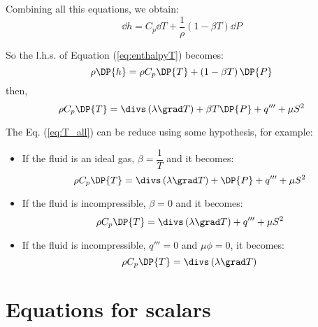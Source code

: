 Combining all this equations, we obtain:
\begin{equation}
  \dd h=C_p \dd T + \frac{1}{\rho} \left( 1-\beta T \right)\dd P
\end{equation}

So the l.h.s. of Equation (\ref{eq:enthalpyT}) becomes:
\begin{equation}
 \rho \DP{h} = \rho C_p \DP{T} + \left( 1-\beta T \right)\DP{P}
\end{equation}
%
 then,
\begin{equation}
  \rho C_p \DP{T}=  \divs \left( \lambda \grad T \right) + \beta T \DP{P} +q''' + \mu S^2
\label{eq:T_all}
\end{equation}

The Eq. (\ref{eq:T_all}) can be reduce using some hypothesis, for example:
\begin{itemize}
 \item If the fluid is an ideal gas, $\beta=\dfrac{1}{T}$ and it becomes:
\begin{equation}
  \rho C_p \DP{T}=  \divs \left( \lambda \grad T \right) + \DP{P} +q''' + \mu S^2
\end{equation}

 \item If the fluid is incompressible, $\beta=0$ and it becomes:
\begin{equation}
  \rho C_p \DP{T}=  \divs \left( \lambda \grad T \right) +q''' + \mu S^2
\end{equation}

 \item If the fluid is incompressible, $q'''=0$ and $\mu \phi=0$,  it becomes:
\begin{equation}
  \rho C_p \DP{T}=  \divs \left( \lambda \grad T \right)
\end{equation}
\end{itemize}


\section{Equations for scalars}

